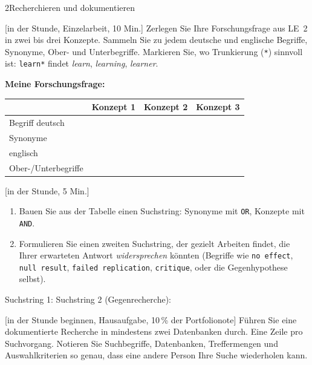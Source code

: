 \begin{uebungsblattb}{2}{Recherchieren und dokumentieren}

[in der Stunde, Einzelarbeit, 10 Min.]
Zerlegen Sie Ihre Forschungsfrage aus LE~2 in zwei bis drei Konzepte. Sammeln
Sie zu jedem deutsche und englische Begriffe, Synonyme, Ober- und
Unterbegriffe. Markieren Sie, wo Trunkierung (\texttt{*}) sinnvoll ist:
\texttt{learn*} findet \emph{learn}, \emph{learning}, \emph{learner}.

\smallskip
\noindent\textbf{Meine Forschungsfrage:}
\begin{center}
\renewcommand{\arraystretch}{2.0}
\begin{tabular}{|p{}|p{}|p{}|p{}|}
\hline
 & \textbf{Konzept 1} & \textbf{Konzept 2} & \textbf{Konzept 3} \\ \hline
Begriff deutsch & & & \\ \hline
Synonyme & & & \\ \hline
englisch & & & \\ \hline
Ober-/Unterbegriffe & & & \\ \hline
\end{tabular}
\end{center}

[in der Stunde, 5 Min.]
\begin{enumerate}
  \item Bauen Sie aus der Tabelle einen Suchstring: Synonyme mit \texttt{OR},
    Konzepte mit \texttt{AND}.
  \item Formulieren Sie einen zweiten Suchstring, der gezielt Arbeiten findet,
    die Ihrer erwarteten Antwort \emph{widersprechen} könnten (Begriffe wie
    \texttt{no effect}, \texttt{null result}, \texttt{failed replication},
    \texttt{critique}, oder die Gegenhypothese selbst).
\end{enumerate}
\noindent Suchstring 1:
\noindent Suchstring 2 (Gegenrecherche):

[in der Stunde beginnen, Hausaufgabe, 10\,\% der Portfolionote]
Führen Sie eine dokumentierte Recherche in mindestens zwei Datenbanken durch.
Eine Zeile pro Suchvorgang. Notieren Sie Suchbegriffe, Datenbanken,
Treffermengen und Auswahlkriterien so genau, dass eine andere Person Ihre
Suche wiederholen kann.


\end{uebungsblattb}
